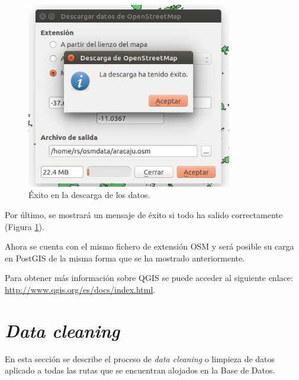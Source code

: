 \begin{figure}[h]
  \centering
    \includegraphics[width=0.8\textwidth]{../img/qgis/exito_2.jpg}
  \caption{Éxito en la descarga de los datos.}
  \label{exito}
\end{figure}
Por último, se mostrará un mensaje de éxito si todo ha salido correctamente (Figura \ref{exito}).

Ahora se cuenta con el mismo fichero de extensión OSM y será posible su carga en PostGIS de la misma forma que se ha mostrado anteriormente.

Para obtener más información sobre QGIS se puede acceder al siguiente enlace: \url{http://www.qgis.org/es/docs/index.html}.



\section{\textit{Data cleaning}}
En esta sección se describe el proceso de \textit{data cleaning} o limpieza de datos aplicado a todas las rutas que se encuentran alojados en la Base de Datos.


